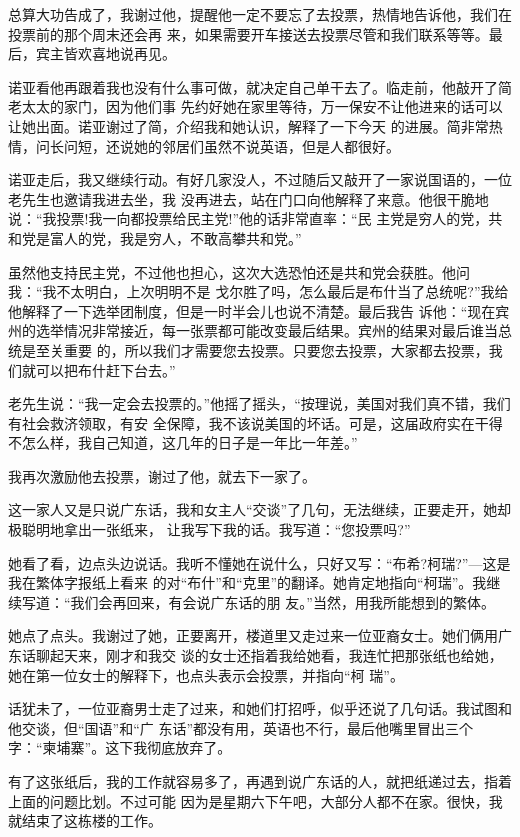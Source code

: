 ﻿\documentclass[11pt]{article}
\begin{document}
总算大功告成了，我谢过他，提醒他一定不要忘了去投票，热情地告诉他，我们在投票前的那个周末还会再
来，如果需要开车接送去投票尽管和我们联系等等。最后，宾主皆欢喜地说再见。

诺亚看他再跟着我也没有什么事可做，就决定自己单干去了。临走前，他敲开了简老太太的家门，因为他们事
先约好她在家里等待，万一保安不让他进来的话可以让她出面。诺亚谢过了简，介绍我和她认识，解释了一下今天
的进展。简非常热情，问长问短，还说她的邻居们虽然不说英语，但是人都很好。


诺亚走后，我又继续行动。有好几家没人，不过随后又敲开了一家说国语的，一位老先生也邀请我进去坐，我
没再进去，站在门口向他解释了来意。他很干脆地说：``我投票!我一向都投票给民主党!''他的话非常直率：``民
主党是穷人的党，共和党是富人的党，我是穷人，不敢高攀共和党。''

虽然他支持民主党，不过他也担心，这次大选恐怕还是共和党会获胜。他问我：``我不太明白，上次明明不是
戈尔胜了吗，怎么最后是布什当了总统呢?''我给他解释了一下选举团制度，但是一时半会儿也说不清楚。最后我告
诉他：``现在宾州的选举情况非常接近，每一张票都可能改变最后结果。宾州的结果对最后谁当总统是至关重要
的，所以我们才需要您去投票。只要您去投票，大家都去投票，我们就可以把布什赶下台去。''

老先生说：``我一定会去投票的。''他摇了摇头，``按理说，美国对我们真不错，我们有社会救济领取，有安
全保障，我不该说美国的坏话。可是，这届政府实在干得不怎么样，我自己知道，这几年的日子是一年比一年差。''

我再次激励他去投票，谢过了他，就去下一家了。

这一家人又是只说广东话，我和女主人``交谈''了几句，无法继续，正要走开，她却极聪明地拿出一张纸来，
让我写下我的话。我写道：``您投票吗?''

她看了看，边点头边说话。我听不懂她在说什么，只好又写：``布希?柯瑞?''---这是我在繁体字报纸上看来
的对``布什''和``克里''的翻译。她肯定地指向``柯瑞''。我继续写道：``我们会再回来，有会说广东话的朋
友。''当然，用我所能想到的繁体。

她点了点头。我谢过了她，正要离开，楼道里又走过来一位亚裔女士。她们俩用广东话聊起天来，刚才和我交
谈的女士还指着我给她看，我连忙把那张纸也给她，她在第一位女士的解释下，也点头表示会投票，并指向``柯
瑞''。

话犹未了，一位亚裔男士走了过来，和她们打招呼，似乎还说了几句话。我试图和他交谈，但``国语''和``广
东话''都没有用，英语也不行，最后他嘴里冒出三个字：``柬埔寨''。这下我彻底放弃了。

有了这张纸后，我的工作就容易多了，再遇到说广东话的人，就把纸递过去，指着上面的问题比划。不过可能
因为是星期六下午吧，大部分人都不在家。很快，我就结束了这栋楼的工作。
\end{document}
